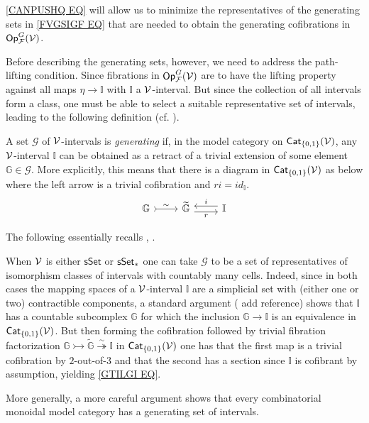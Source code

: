 \documentclass[a4paper,10pt
,draft
]{article}%
\renewcommand{\F}{\mathcal F}
\renewcommand{\1}{\eta}%
\begin{document}
\eqref{CANPUSHQ EQ} will allow us to minimize  
the representatives of the generating sets in \eqref{FVGSIGF EQ}
that are needed to obtain the generating cofibrations in 
$\mathsf{Op}^G_{\F}(\V)$.

Before describing the generating sets, however, we need to address the path-lifting condition.
Since fibrations in $\mathsf{Op}^G_{\F}(\V)$ are to have the lifting property against all maps $\eta \to \mathbb I$
with $\mathbb{I}$ a $\mathcal V$-interval.
But since the collection of all intervals form a class, one must be able to select a suitable representative set of intervals, leading to the following definition (cf. \cite{BM13}).




\begin{definition}
	A set $\mathscr{G}$ of $\mathcal V$-intervals is \textit{generating} if,
	in the model category on $\mathsf{Cat}_{\left\{0,1\right\}}(\mathcal V)$,
	any $\mathcal V$-interval $\mathbb{I}$ can be obtained
	as a retract of a trivial extension of some element
	$\mathbb{G} \in \mathscr{G}$.
	More explicitly, this means that there is a diagram in 
	$\mathsf{Cat}_{\left\{0,1\right\}}(\mathcal V)$ as below
	where the left arrow is a trivial cofibration and
	$ri = id_{\mathbb{I}}$.
\begin{equation}\label{GTILGI EQ}
	\begin{tikzcd}
		\mathbb{G} \arrow[r,rightarrowtail, "\sim"]
	&
		\widetilde{\mathbb{G}} \arrow[r,yshift=-.3em, "r"']
	&
		\mathbb{I} \arrow[l,yshift=.3em, "i"']
	\end{tikzcd}
\end{equation}
\end{definition}


The following essentially recalls \cite[1.20]{CM13b}, \cite[\S 4.3]{Cav}.


\begin{remark}
When $\mathcal V$ is either $\mathsf{sSet}$ or $\mathsf{sSet}_{\**}$
one can take $\mathscr{G}$ to be a set of representatives of isomorphism classes of intervals with countably many cells.
Indeed, since in both cases the mapping spaces of a $\mathcal V$-interval
$\mathbb{I}$ are a simplicial set with (either one or two) contractible components,
a standard argument ({\color{red} add reference})
shows that $\mathbb{I}$ has a countable subcomplex 
$\mathbb{G}$ for which the inclusion 
$\mathbb{G} \to \mathbb{I}$
is an equivalence in $\mathsf{Cat}_{\{0,1\}}(\mathcal V)$.
But then forming the cofibration followed by trivial fibration factorization
$\mathbb{G} \rightarrowtail \widetilde{\mathbb{G}}
\overset{\sim}{\twoheadrightarrow} \mathbb{I}$
in $\mathsf{Cat}_{\{0,1\}}(\mathcal V)$
one has that the first map is a trivial cofibration by $2$-out-of-$3$
and that the second has a section since $\mathbb{I}$ is cofibrant by assumption, yielding \eqref{GTILGI EQ}.

More generally, a more careful argument \cite[Lemma 1.12]{BM13}
shows that every combinatorial monoidal model category
has a generating set of intervals.
\end{remark}
\end{document}
